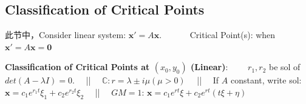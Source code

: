 \documentclass[8pt]{extarticle}
\begin{document}
\subsection{Classification of Critical Points}

\vspace{-2pt}
{\tiny * 此节中，Consider linear system: $\mathbf{x}'=A\mathbf{x}$. \ \ \ \ \ \ Critical Point(s): when $\mathbf{x}'=A\mathbf{x}=\mathbf{0}$}
\vspace{-2pt}

\textbf{Classification of Critical Points at $(x_0,y_0)$ (Linear)}: \ \ \ \ $r_1,r_2$ be sol of $det(A-\lambda I)=0$. \ \ || \ \ $\mathbb{C}:r=\lambda\pm i\mu(\mu>0)$ \ \ || \ \ If $A$ constant, write sol: $\mathbf{x}=c_1e^{r_1t}\xi_1+c_2e^{r_2t}\xi_2$ \ \ || \ \ $GM=1$: $\mathbf{x}=c_1e^{rt}\xi+c_2e^{rt}(t\xi+\eta)$
\end{document}
